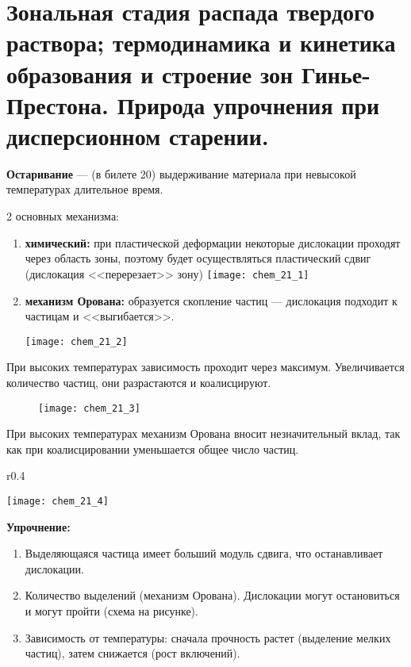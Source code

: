 \section{Зональная стадия распада твердого раствора; термодинамика и кинетика образования и строение зон Гинье-Престона. Природа упрочнения при дисперсионном старении.}

\textbf{Остаривание} --- (в билете 20) выдерживание материала при невысокой температурах длительное время.

2 основных механизма: 

\begin{enumerate}
    \item \textbf{химический:} при пластической деформации некоторые дислокации проходят через область  зоны, 	поэтому 	будет 	осуществляться пластический сдвиг (дислокация <<перерезает>> зону)
   \texttt{[image: chem\_21\_1]}

    \item \textbf{механизм Орована:} образуется скопление частиц --- дислокация подходит к частицам и <<выгибается>>.
    
    \texttt{[image: chem\_21\_2]}
\end{enumerate}




При высоких температурах зависимость проходит через максимум. Увеличивается количество частиц, они разрастаются и коалисцируют.

\begin{figure}[h!]
    \centering
    \texttt{[image: chem\_21\_3]}
\end{figure}



При высоких температурах механизм Орована вносит незначительный вклад, так как при коалисцировании уменьшается общее число частиц. 


\begin{wrapfigure}{r}{0.4\textwidth}
    \begin{center}
        \texttt{[image: chem\_21\_4]}
    \end{center}
\end{wrapfigure}

\textbf{Упрочнение:}
\begin{enumerate}
    \item Выделяющаяся частица имеет больший модуль сдвига, что останавливает дислокации.
    \item Количество выделений (механизм Орована). Дислокации могут остановиться и могут пройти (схема на рисунке).
    \item Зависимость от температуры: сначала прочность растет (выделение мелких частиц), затем снижается (рост включений).
\end{enumerate}

